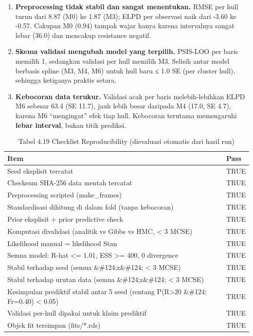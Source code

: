\documentclass[
]{article}
\providecommand{\tightlist}{%
  \setlength{\itemsep}{0pt}\setlength{\parskip}{0pt}}
\begin{document}
\begin{enumerate}
\def\labelenumi{\arabic{enumi}.}
\tightlist
\item
  \textbf{Preprocessing tidak stabil dan sangat menentukan.} RMSE per
  hull turun dari 8.87 (M0) ke 1.87 (M3); ELPD per observasi naik dari
  -3.60 ke -0.57. Cakupan M0 (0.94) tampak wajar hanya karena
  intervalnya sangat lebar (36.0) dan mencakup resistance negatif.
\item
  \textbf{Skema validasi mengubah model yang terpilih.} PSIS-LOO per
  baris memilih 1, sedangkan validasi per hull memilih M3. Selisih antar
  model berbasis spline (M3, M4, M6) untuk hull baru ≤ 1.0 SE (per
  cluster hull), sehingga ketiganya praktis setara.
\item
  \textbf{Kebocoran data terukur.} Validasi acak per baris
  melebih-lebihkan ELPD M6 sebesar 63.4 (SE 11.7), jauh lebih besar
  daripada M4 (17.0, SE 4.7), karena M6 ``mengingat'' efek tiap hull.
  Kebocoran terutama memengaruhi \textbf{lebar interval}, bukan titik
  prediksi.
\end{enumerate}

\begingroup\fontsize{8.5}{10.5}\selectfont

\begin{longtable}[t]{ll}
\caption{\label{tab:tabel_check}Tabel 4.19 Checklist Reproducibility (dievaluasi otomatis dari hasil run)}\\
\toprule
Item & Pass\\
\midrule
Seed eksplisit tercatat & TRUE\\
Checksum SHA-256 data mentah tercatat & TRUE\\
Preprocessing scripted (make\_frames) & TRUE\\
Standardisasi dihitung di dalam fold (tanpa kebocoran) & TRUE\\
Prior eksplisit + prior predictive check & TRUE\\
\addlinespace
Komputasi divalidasi (analitik vs Gibbs vs HMC, < 3 MCSE) & TRUE\\
Likelihood manual = likelihood Stan & TRUE\\
Semua model: R-hat <= 1.01, ESS >= 400, 0 divergence & TRUE\\
Stabil terhadap seed (semua \&\#124;z\&\#124; < 3 MCSE) & TRUE\\
Stabil terhadap urutan data (semua \&\#124;z\&\#124; < 3 MCSE) & TRUE\\
\addlinespace
Kesimpulan prediktif stabil antar 5 seed (rentang P(R>20 \&\#124; Fr=0.40) < 0.05) & TRUE\\
Validasi per-hull dipakai untuk klaim prediktif & TRUE\\
Objek fit tersimpan (fits/*.rds) & TRUE\\
\bottomrule
\end{longtable}
\endgroup{}
\end{document}
